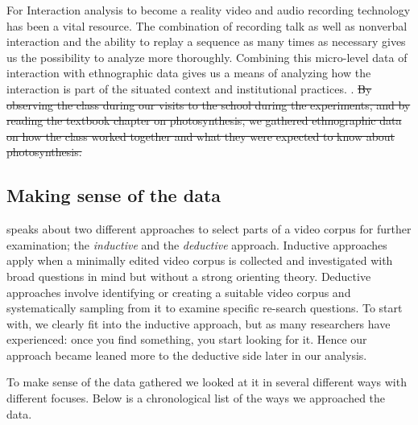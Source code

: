For Interaction analysis to become a reality video and audio recording technology has been a vital resource. The combination of recording talk as well as nonverbal interaction and the ability to replay a sequence as many times as necessary gives us the possibility to analyze more thoroughly. Combining this micro-level data of interaction with ethnographic data gives us a means of analyzing how the interaction is part of the situated context and institutional practices. \citep{furberg2009scientific}. \sout{ By observing the class during our visits to the school during the experiments, and by reading the textbook chapter on photosynthesis, we gathered ethnographic data on how the class worked together and what they were expected to know about photosynthesis. }


\subsection{Making sense of the data}
\citet{derry2010conducting} speaks about two different approaches to select parts of a video corpus for further examination; the \emph{inductive} and the \emph{deductive} approach. Inductive approaches apply when a minimally edited video corpus is collected and investigated with broad questions in mind but without a strong orienting theory. Deductive approaches involve identifying or creating a suitable video corpus and systematically sampling from it to examine specific re-search questions. \citep{derry2010conducting} To start with, we clearly fit into the inductive approach, but as many researchers have experienced: once you find something, you start looking for it. Hence our approach became leaned more to the deductive side later in our analysis.


To make sense of the data gathered we looked at it in several different ways with different focuses. Below is a chronological list of the ways we approached the data. 


